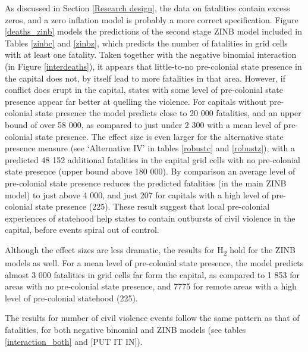As discussed in Section \ref{Research design}, the data on fatalities contain
excess zeros, and a zero inflation model is probably a more correct
specification. Figure \ref{deaths_zinb} models the predictions of the second
stage ZINB model included in Tables \ref{zinbc} and \ref{zinbz}, which predicts
the number of fatalities in grid cells with at least one fatality. Taken
together with the negative binomial interaction (in Figure \ref{interdeaths}),
it appears that little-to-no pre-colonial state presence in the capital does
not, by itself lead to more fatalities in that area. However, if conflict does
erupt in the capital, states with some level of pre-colonial state presence
appear far better at quelling the violence. For capitals without pre-colonial
state presence the model predicts close to 20 000 fatalities, and an upper bound
of over 58 000, as compared to just under 2 300 with a mean level of
pre-colonial state presence. The effect size is even larger for the alternative
state presence measure (see `Alternative IV' in tables \ref{robustc} and
\ref{robustz}), with a predicted 48 152 additional fatalities in the capital
grid cells with no pre-colonial state presence (upper bound above 180 000). By
comparison an average level of pre-colonial state presence reduces the predicted
fatalities (in the main ZINB model) to just above 4 000, and just 207 for
capitals with a high level of pre-colonial state presence (225). These result
suggest that local pre-colonial experiences of statehood help states to contain
outbursts of civil violence in the capital, before events spiral out of control.

Although the effect sizes are less dramatic, the results for H\textsubscript{2}
hold for the ZINB models as well. For a mean level of pre-colonial state
presence, the model predicts almost 3 000 fatalities in grid cells far form the
capital, as compared to 1 853 for areas with no pre-colonial state presence, and
7775 for remote areas with a high level of pre-colonial statehood (225).

The results for number of civil violence events follow the same pattern as that
of fatalities, for both negative binomial and ZINB models (see tables
\ref{interaction_both} and [PUT IT IN]).


